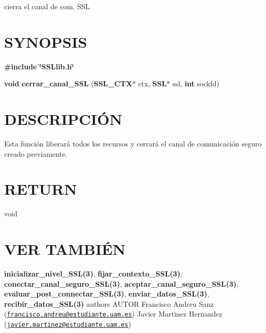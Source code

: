 cierra el canal de com. S\-S\-L\hypertarget{unknown_case_SYNOPSIS}{}\section{S\-Y\-N\-O\-P\-S\-I\-S}\label{unknown_case_SYNOPSIS}
{\bfseries \#include} {\bfseries \char`\"{}\-S\-S\-Llib.\-h\char`\"{}} 

{\bfseries void} {\bfseries cerrar\-\_\-canal\-\_\-\-S\-S\-L} {\bfseries }({\bfseries S\-S\-L\-\_\-\-C\-T\-X$\ast$} ctx, {\bfseries S\-S\-L$\ast$} ssl, {\bfseries int} sockfd{\bfseries })\hypertarget{unknown_case_descripcion}{}\section{D\-E\-S\-C\-R\-I\-P\-C\-IÓ\-N}\label{unknown_case_descripcion}
Esta función liberará todos los recursos y cerrará el canal de comunicación seguro creado previamente.\hypertarget{cerrar_canal_SSL_return}{}\section{R\-E\-T\-U\-R\-N}\label{cerrar_canal_SSL_return}
void\hypertarget{unknown_case_seealso}{}\section{V\-E\-R T\-A\-M\-B\-IÉ\-N}\label{unknown_case_seealso}
{\bfseries inicializar\-\_\-nivel\-\_\-\-S\-S\-L(3)}, {\bfseries fijar\-\_\-contexto\-\_\-\-S\-S\-L(3)}, {\bfseries conectar\-\_\-canal\-\_\-seguro\-\_\-\-S\-S\-L(3)}, {\bfseries aceptar\-\_\-canal\-\_\-seguro\-\_\-\-S\-S\-L(3)}, {\bfseries evaluar\-\_\-post\-\_\-connectar\-\_\-\-S\-S\-L(3)}, {\bfseries enviar\-\_\-datos\-\_\-\-S\-S\-L(3)}, {\bfseries recibir\-\_\-datos\-\_\-\-S\-S\-L(3)} {\bfseries }  authors A\-U\-T\-O\-R Francisco Andreu Sanz (\href{mailto:francisco.andreu@estudiante.uam.es}{\tt francisco.\-andreu@estudiante.\-uam.\-es}) Javier Martinez Hernandez (\href{mailto:javier.martinez@estudiante.uam.es}{\tt javier.\-martinez@estudiante.\-uam.\-es}) 